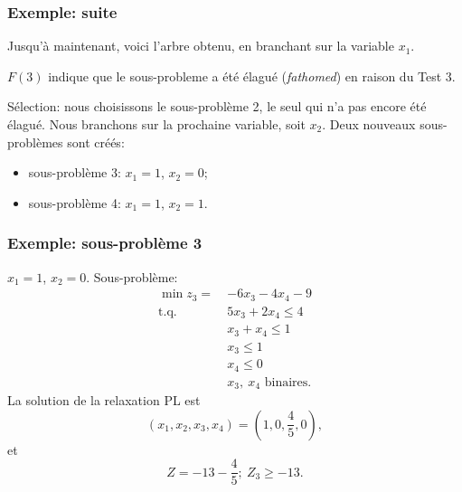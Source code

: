 \documentclass[usepdftitle=false, aspectratio=169]{beamer}
\def\st{\mbox{t.q. }}
\begin{document}
\begin{frame}
\frametitle{Exemple: suite}

Jusqu'à maintenant, voici l'arbre obtenu, en branchant sur la variable $x_1$.
\begin{center}
\end{center}
$F(3)$ indique que le sous-probleme a été élagué ({\sl fathomed}) en raison du Test 3.

\mbox{}

Sélection: nous choisissons le sous-problème 2, le seul qui n'a pas encore été élagué.
Nous branchons sur la prochaine variable, soit $x_2$.
Deux nouveaux sous-problèmes sont créés:
\begin{itemize}
\item
sous-problème 3: $x_1 = 1$, $x_2 = 0$;
\item
sous-problème 4: $x_1 = 1$, $x_2 = 1$.
\end{itemize}

\end{frame}

\begin{frame}
\frametitle{Exemple: sous-problème 3}

$x_1 = 1$, $x_2 = 0$. Sous-problème:
\begin{align*}
\min z_3 =\ & -6x_3 -4x_4 -9 \\
\st{} & 5 x_3 + 2x_4 \leq 4 \\
& x_3 + x_4 \leq 1 \\
& x_3 \leq 1 \\
& x_4 \leq 0 \\
& x_3,\ x_4 \mbox{ binaires}.
\end{align*}
La solution de la relaxation PL est
\[
( x_1, x_2, x_3, x_4) = \left(1,0, \frac{4}{5},0 \right),
\]
et
\[
Z = -13-\frac{4}{5};\ Z_3 \geq -13.
\]

\end{frame}
\end{document}
